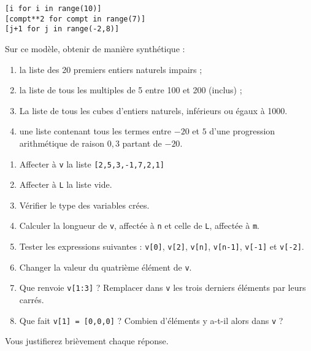 \begin{lstlisting}
[i for i in range(10)]
[compt**2 for compt in range(7)]
[j+1 for j in range(-2,8)]
\end{lstlisting}
Sur ce modèle, obtenir de manière synthétique : 
\begin{enumerate}[label=\emph{\alph*)}]
  \item la liste des 20 premiers entiers naturels impairs ;
  \item la liste de tous les multiples de 5 entre 100 et 200 (inclus) ;
  \item La liste de tous les cubes d'entiers naturels, inférieurs ou égaux à 1000. 
  \item une liste contenant tous les termes entre $-20$ et $5$ d'une progression arithmétique de raison $0,3$ partant de $-20$.
\end{enumerate}

\question{}
\begin{enumerate}[label = \emph{\alph*)}]
  \item Affecter à \texttt{v} la liste \texttt{[2,5,3,-1,7,2,1]}
  \item Affecter à \texttt{L} la liste vide.
  \item Vérifier le type des variables crées.
  \item Calculer la longueur de \texttt{v}, affectée à \texttt{n} et celle de \texttt{L}, affectée à \texttt{m}.
  \item Tester les expressions suivantes : \texttt{v[0]}, \texttt{v[2]}, \texttt{v[n]}, \texttt{v[n-1]}, \texttt{v[-1]} et \texttt{v[-2]}.
  \item Changer la valeur du quatrième élément de \texttt{v}.
  \item Que renvoie \texttt{v[1:3]} ? Remplacer dans \texttt{v} les trois derniers éléments par leurs carrés.
  \item Que fait \texttt{v[1] = [0,0,0]} ? Combien d'éléments y a-t-il alors dans \texttt{v} ?
\end{enumerate}


Vous justifierez brièvement chaque réponse. 

